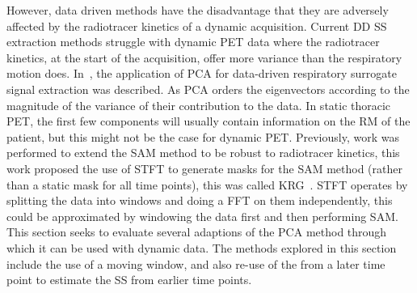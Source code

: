             However, data driven methods have the disadvantage that they are adversely affected by the radiotracer kinetics of a dynamic acquisition. Current \gls{DD} \gls{SS} extraction methods struggle with dynamic \gls{PET} data where the radiotracer kinetics, at the start of the acquisition, offer more variance than the respiratory motion does. In~, the application of \gls{PCA} for data-driven respiratory surrogate signal extraction was described. As \gls{PCA} orders the eigenvectors according to the magnitude of the variance of their contribution to the data. In static thoracic \gls{PET}, the first few components will usually contain information on the \gls{RM} of the patient, but this might not be the case for dynamic \gls{PET}. Previously, work was performed to extend the \gls{SAM} method to be robust to radiotracer kinetics, this work proposed the use of \gls{STFT} to generate masks for the \gls{SAM} method (rather than a static mask for all time points), this was called \gls{KRG}~. \gls{STFT} operates by splitting the data into windows and doing a \gls{FFT} on them independently, this could be approximated by windowing the data first and then performing \gls{SAM}. This section seeks to evaluate several adaptions of the \gls{PCA} method through which it can be used with dynamic data. The methods explored in this section include the use of a moving window, and also re-use of the  from a later time point to estimate the \gls{SS} from earlier time points.
        
